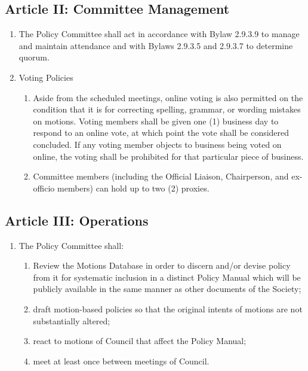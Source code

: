 \subsection{Article II: Committee Management}
\begin{enumerate}[label*=\arabic*., align=left]	
\item The Policy Committee shall act in accordance with Bylaw 2.9.3.9 to manage and maintain
attendance and with Bylaws 2.9.3.5 and 2.9.3.7 to determine quorum.
\item Voting Policies
\begin{enumerate}[label*=\arabic*., align=left]	
\item Aside from the scheduled meetings, online voting is also permitted on the condition that it is for correcting spelling, grammar, or wording mistakes on motions. Voting members shall be given one (1) business day to respond to an online vote, at which point the vote shall be considered concluded. If any voting member objects to business being voted on online, the voting shall be prohibited for that particular piece of business.
\item Committee members (including the Official Liaison, Chairperson, and ex-officio members) can hold up to two (2) proxies.
\end{enumerate}
\end{enumerate}

\subsection{Article III: Operations}
\begin{enumerate}[label*=\arabic*., align=left]	
\item The Policy Committee shall:
\begin{enumerate}[label*=\arabic*., align=left]
\item Review the Motions Database in order to discern and/or devise policy from it for systematic inclusion in a distinct Policy Manual which will be publicly available in the same manner as other documents of the Society;
\item draft motion-based policies so that the original intents of motions are not substantially altered;
\item react to motions of Council that affect the Policy Manual;
\item meet at least once between meetings of Council.
\end{enumerate}
\end{enumerate}